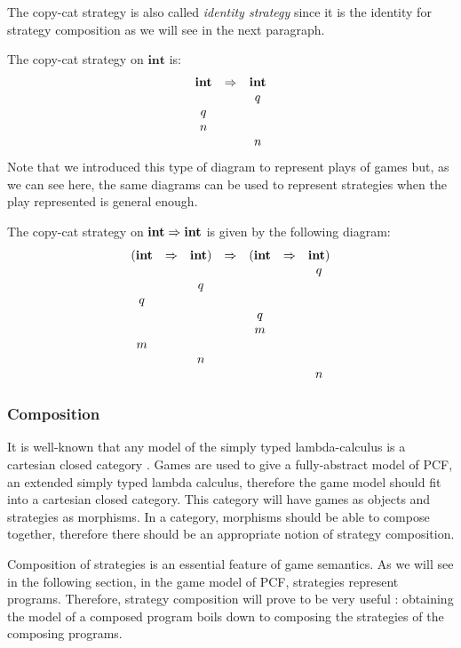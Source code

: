 The copy-cat strategy is also called \emph{identity strategy} since
it is the identity for strategy composition as we will see in the
next paragraph.

\begin{exmp} The copy-cat strategy on $\textbf{int}$ is:
$$\begin{array}{ccc}
\textbf{int} & \Rightarrow & \textbf{int} \\
&& q\\
q \\
n \\
&& n
\end{array}
$$
Note that we introduced this type of diagram to represent plays of
games but, as we can see here, the same diagrams can be used to
represent strategies when the play represented is general enough.

The copy-cat strategy on $\textbf{int} \Rightarrow \textbf{int}$ is given
by the following diagram:
$$\begin{array}{ccccccc}
(\textbf{int} & \Rightarrow & \textbf{int}) & \Rightarrow & (\textbf{int} & \Rightarrow & \textbf{int}) \\
&&&& && q\\
&& q\\
q \\
&&&& q \\
&&&& m \\
m\\
&& n \\
&&&& && n
\end{array}$$
\end{exmp}

\subsubsection{Composition}

It is well-known that any model of the simply typed lambda-calculus
is a cartesian closed category \citep{CroleRL:catt}. Games are used
to give a fully-abstract model of PCF, an extended simply typed
lambda calculus, therefore the game model should fit into a
cartesian closed category. This category will have games as objects
and strategies as morphisms. In a category, morphisms should be able
to compose together, therefore there should be an appropriate notion
of strategy composition.

Composition of strategies is an essential feature of game semantics.
As we will see in the following section, in the game model of PCF,
strategies represent programs. Therefore, strategy composition will
prove to be very useful : obtaining the model of a composed program
boils down to composing the strategies of the composing programs.

